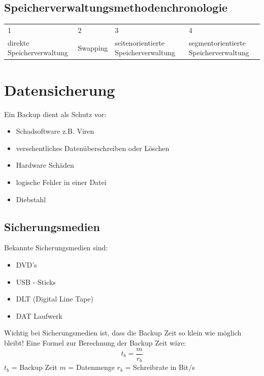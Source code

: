 \documentclass[12pt,a4paper]{article}
\begin{document}
\subsection{Speicherverwaltungsmethodenchronologie}
	\begin{center}
		\begin{tabularx}{\columnwidth}{XXXX}
		1&2&3&4\\
		direkte Speicherverwaltung & Swapping & seitenorientierte Speicherverwaltung & segmentorientierte Speicherverwaltung\\
		\end{tabularx}
	\end{center}

\section{Datensicherung}
    Ein Backup dient als Schutz vor:
	\begin{itemize}
		\item Schadsoftware z.B. Viren
		\item versehentliches Datenüberschreiben oder Löschen
		\item Hardware Schäden
		\item logische Fehler in einer Datei
		\item Diebstahl
	\end{itemize}

\subsection{Sicherungsmedien}
    Bekannte Sicherungsmedien sind:
	\begin{itemize}
		\item DVD's
		\item USB - Sticks
		\item DLT (Digital Line Tape)
		\item DAT Laufwerk
	\end{itemize}
    Wichtig bei Sicherungsmedien ist, dass die Backup Zeit so klein wie möglich bleibt! Eine Formel zur Berechnung der Backup Zeit wäre:
	\begin{equation*}
		t_b = \dfrac{m}{r_b}
	\end{equation*}
$t_b$ = Backup Zeit \hspace{3cm} $m$ = Datenmenge \hspace{3cm} $r_b$ = Schreibrate in Bit/s
\end{document}
